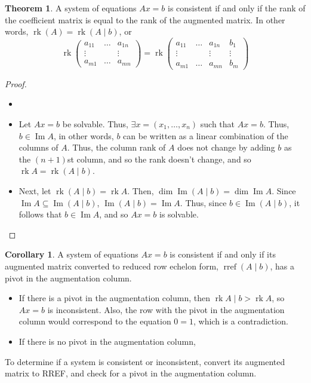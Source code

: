 \documentclass[letterpaper,12pt]{article}
\theoremstyle{definition}
\newtheorem*{theorem}{Theorem}
\newtheorem*{corollary}{Corollary}
\DeclareMathOperator{\Image}{Im}
\DeclareMathOperator{\rk}{rk}
\DeclareMathOperator{\matrref}{rref}
\begin{document}
\begin{theorem}
A system of equations $Ax = b$ is consistent if and only if the rank of the coefficient matrix is equal to the rank of the augmented matrix. In other words, $\rk{(A)} = \rk{(A \mid b)}$, or
\begin{equation*}
    \rk{\begin{pmatrix} a_{11} & \dots & a_{1n} \\ \vdots & & \vdots \\ a_{m1} & \dots & a_{mn} \end{pmatrix}} = \rk{\begin{pmatrix} a_{11} & \dots & a_{1n} & b_1 \\ \vdots & & \vdots & \vdots \\ a_{m1} & \dots & a_{mn} & b_m \end{pmatrix}}
\end{equation*}
\end{theorem}
\begin{proof}
\begin{itemize}
    \item[]
    \item Let $Ax = b$ be solvable. Thus, $\exists x = (x_1, \dots, x_n)$ such that $Ax = b$. Thus, $b \in \Image{A}$, in other words, $b$ can be written as a linear combination of the columns of $A$. Thus, the column rank of $A$ does not change by adding $b$ as the $(n+1)$st column, and so the rank doesn't change, and so $\rk{A} = \rk{(A \mid b)}$.
    \item Next, let $\rk{(A \mid b)} = \rk{A}$. Then, $\dim{\Image{(A \mid b)}} = \dim{\Image{A}}$. Since $\Image{A} \subseteq \Image{(A \mid b)}$, $\Image{(A \mid b)} = \Image{A}$. Thus, since $b \in \Image{(A \mid b)}$, it follows that $b \in \Image{A}$, and so $Ax = b$ is solvable.
\end{itemize}
\end{proof}

\begin{corollary}
A system of equations $Ax = b$ is consistent if and only if its augmented matrix converted to reduced row echelon form, $\matrref{(A \mid b)}$, has a pivot in the augmentation column.
\begin{itemize}
    \item If there is a pivot in the augmentation column, then $\rk{A \mid b} > \rk{A}$, so $Ax = b$ is inconsistent. Also, the row with the pivot in the augmentation column would correspond to the equation $0=1$, which is a contradiction.
    \item If there is no pivot in the augmentation column, 
\end{itemize}
\end{corollary}
To determine if a system is consistent or inconsistent, convert its augmented matrix to RREF, and check for a pivot in the augmentation column.
\end{document}
